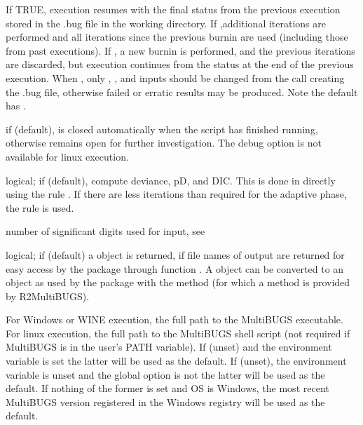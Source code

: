 \begin{Arguments}
\begin{ldescription}
\item[\code{restart}] If TRUE, execution resumes with the final status from
the previous execution stored in the .bug file in the working directory.
If ,additional iterations are performed and all iterations since
the previous burnin are used (including those from past executions).  If
, a new burnin is performed, and the previous iterations are
discarded, but execution continues from the status at the end of the previous
execution.  When , only , ,
and  inputs
should be changed from the call creating the .bug file, otherwise
failed or erratic results may be produced.  Note the default has .

\item[\code{debug}] if  (default),  is closed automatically
when the script has finished running, otherwise  remains open
for further investigation.  The debug option is not available for linux execution.
\item[\code{DIC}] logical; if  (default), compute deviance, pD,
and DIC. This is done in  directly using the rule .  If there are less iterations than required for the
adaptive phase, the rule  is used.
\item[\code{digits}] number of significant digits used for  input, see
\item[\code{codaPkg}] logical; if  (default) a  object
is returned, if  file names of  output are
returned for easy access by the  package through function
.
A  object can be converted to an  object as
used by the  package with the method 
(for which a method is provided by R2MultiBUGS).
\item[\code{MultiBUGS.pgm}]  For Windows or WINE execution, the full path to the MultiBUGS
executable.  For linux execution, the full path to the MultiBUGS shell script (not
required if MultiBUGS is in the user's PATH variable).
If  (unset) and the environment variable  is set the latter will be used as the default.
If  (unset), the environment variable  is unset and the global option  is not  the latter will be used as the default.
If nothing of the former is set and OS is Windows, the most recent MultiBUGS version
registered in the Windows registry  will be used as the default.


\end{ldescription}
\end{Arguments}
